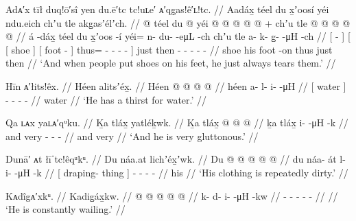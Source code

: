 \ex\label{ex:106-28-shoe-tear}%
%
\begingl
	\glpreamble	Adᴀ′x tīł duq!ō′sî yen du.ē′tc tc!uʟe′ ᴀ′qg̣as!ê′ʟ!tc. //
	\glpreamble	Aadáx̱ téel du x̱ʼoosí yéi ndu.eich chʼu tle akg̱asʼélʼch. //
	\gla	{}  @ {} {}
		{} {} téel {} {} du  @ {} {}
			yéi @  @ {} @ {} @ {} @ {} {} +
		chʼu tle  @ {} @ {} @ {} @ {} @ {} //
	\glb	{} á -dáx̱ {}
		{} {} téel {} {} du x̱ʼoos -í {}
			yéi= n- du-  -eμL -ch {}
		chʼu tle a- k- g̱-  -μH -ch //
	\glc	{}[  - {}]
		{}[ {}[ shoe {}] {}[  foot - {}]
			thus= - -  - - {}]
		just then - - -  - - //
	\gld	{}  {} {}
		{} {} shoe {} {} his foot -on {}
			thus  {} {} {} {} {}
		just then  {} {} {} {} {} //
	\glft	‘And when people put shoes on his feet, he just always tears them.’
		//
\endgl
\xe

\ex\label{ex:106-29-water-proclivity}%
%
\begingl
	\glpreamble	Hīn ᴀ′łits!êx. //
	\glpreamble	Héen alitsʼéx̱. //
	\gla	{} Héen {}  @ {} @ {} @ {} @ {} //
	\glb	{} héen {} a- l- i-  -μH //
	\glc	{}[ water {}] - - -  - //
	\gld	{} water {}  {} {} {} {} //
	\glft	‘He has a thirst for water.’
		//
\endgl
\xe

\ex\label{ex:106-30-gluttonous}%
%
\begingl
	\glpreamble	Qa ʟᴀx yaʟᴀ′qᵘku. //
	\glpreamble	Ḵa tláx̱ yatléḵwk. //
	\gla	Ḵa tláx̱  @ {} @ {} @ {} //
	\glb	ḵa tláx̱ i-  -μH -k //
	\glc	and very -  - - //
	\gld	and very  {} {} {} //
	\glft	‘And he is very gluttonous.’
		//
\endgl
\xe

\ex\label{ex:106-31-dirty-clothing}%
%
\begingl
	\glpreamble	Dunā′ ᴀt łīˈtc!êqᵘkᵘ. //
	\glpreamble	Du náa.at lichʼéx̱ʼwk. //
	\gla	{} Du  @ {} {}  @ {} @ {} @ {} @ {} //
	\glb	{} du náa- át {} l- i-  -μH -k //
	\glc	{}[  draping- thing {}] - -  - - //
	\gld	{} his  {} {}  {} {} {} {} //
	\glft	‘His clothing is repeatedly dirty.’
		//
\endgl
\xe

\ex\label{ex:106-32-constantly-wailing}%
%
\begingl
	\glpreamble	Kᴀdîgᴀ′xkᵘ. //
	\glpreamble	Kadig̱áx̱kw. //
	\gla	{} @ {} @ {} @ {} @ {} @ {} //
	\glb	k- d- i-  -μH -kw //
	\glc	{}- - -  - - //
	\gld	{} {} {} {} {} {} //
	\glft	‘He is constantly wailing.’
		//
\endgl
\xe

